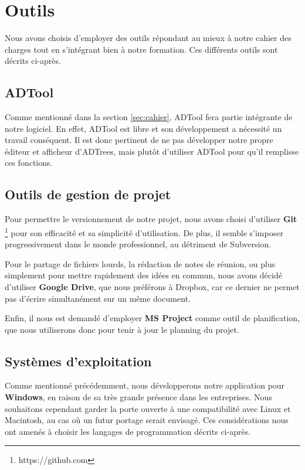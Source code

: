 \section{Outils}
    \label{sec:outils}
    	
		Nous avons choisis d'employer des outils répondant au mieux à notre cahier des charges tout en s'intégrant bien à notre formation.  Ces différents outils sont décrits ci-après.
    	
    \subsection{ADTool}
    	Comme mentionné dans la section \ref{sec:cahier}, ADTool fera partie intégrante de notre logiciel. En effet, ADTool est libre et son développement a nécessité un travail conséquent. Il est donc pertinent de ne pas développer notre propre éditeur et afficheur d'ADTrees, mais plutôt d'utiliser ADTool pour qu'il remplisse ces fonctions.
    
         
    \subsection{Outils de gestion de projet}
        Pour permettre le versionnement de notre projet, nous avons choisi d'utiliser {\bf Git} \footnote{https://github.com} pour son efficacité et sa simplicité d'utilisation. De plus, il semble s'imposer progressivement dans le monde professionnel, au détriment de Subversion.
        
        Pour le partage de fichiers lourds, la rédaction de notes de réunion, ou plus simplement pour mettre rapidement des idées en commun, nous avons décidé d'utiliser {\bf Google Drive}, que nous préférons à Dropbox, car ce dernier ne permet pas d'écrire simultanément sur un même document.

        Enfin, il nous est demandé d'employer {\bf MS Project} comme outil de planification, que nous utiliserons donc pour tenir à jour le planning du projet.

	\subsection{Systèmes d'exploitation}
	   Comme mentionné précédemment, nous développerons notre application pour {\bf Windows}, en raison de sa très grande présence dans les entreprises. Nous souhaitons cependant garder la porte ouverte à une compatibilité avec Linux et Macintosh, au cas où un futur portage serait envisagé. Ces considérations nous ont amenés à choisir les langages de programmation décrits ci-après.
	
